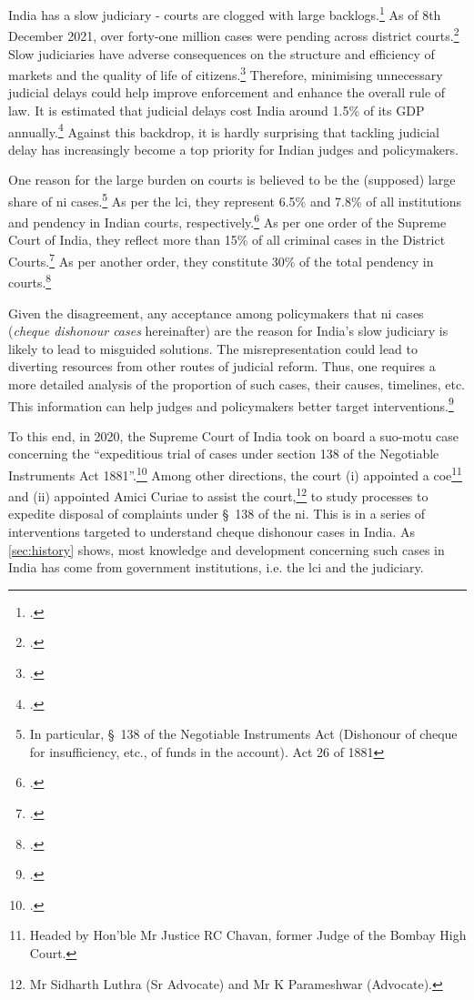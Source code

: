 India has a slow judiciary - courts are clogged with large backlogs.\footcite{moog1992delays, debroy2008justice, dutta2019modernise} As of 8th December 2021, over forty-one million cases were pending across district courts.\footcite{njdg2021} Slow judiciaries have adverse consequences on the structure and efficiency of markets and the quality of life of citizens.\footcite{world2004world, chemin2007impact, rao2020institutional} Therefore, minimising unnecessary judicial delays could help improve enforcement and enhance the overall rule of law. It is estimated that judicial delays cost India around 1.5\% of its GDP annually.\footcite{dey2016_cost} Against this backdrop, it is hardly surprising that tackling judicial delay has increasingly become a top priority for Indian judges and policymakers.

One reason for the large burden on courts is believed to be the (supposed) large share of \gls{ni} cases.\footnote{In particular, \S~138 of the Negotiable Instruments Act (Dishonour of cheque for insufficiency, etc., of funds in the account). Act 26 of 1881} As per the \gls{lci}, they represent 6.5\% and 7.8\% of all institutions and pendency in Indian courts, respectively.\footcite{lci2014_arrears} As per one order of the Supreme Court of India, they reflect more than 15\% of all criminal cases in the District Courts.\footcite{sc2020_makwanavstate} As per another order, they constitute 30\% of the total pendency in courts.\footcite[Similarly, a study published by the Department of Justice briefly touches on the burden of such cases on the judiciary and posits that they constitute 34\% of pending criminal cases in Maharashtra.][]{sc2020_138, mahadik2018_maharashtra}

Given the disagreement, any acceptance among policymakers that \gls{ni} cases (\textit{cheque dishonour cases} hereinafter) are the reason for India's slow judiciary is likely to lead to misguided solutions. The misrepresentation could lead to diverting resources from other routes of judicial reform. Thus, one requires a more detailed analysis of the proportion of such cases, their causes, timelines, etc. This information can help judges and policymakers better target interventions.\footcite[For the importance of accurate judicial data, see][]{damle2020_ecourtsData, daksh2020_data, damle2020_land}

To this end, in 2020, the Supreme Court of India took on board a suo-motu case concerning the “expeditious trial of cases under section 138 of the Negotiable Instruments Act 1881”.\footcite{sc2020_138} Among other directions, the court (i) appointed a \gls{coe}\footnote{Headed by Hon’ble Mr Justice RC Chavan, former Judge of the Bombay High Court.} and (ii) appointed Amici Curiae to assist the court,\footnote{Mr Sidharth Luthra (Sr Advocate) and Mr K Parameshwar (Advocate).} to study processes to expedite disposal of complaints under \S~138 of the \gls{ni}. This is in a series of interventions targeted to understand cheque dishonour cases in India. As \cref{sec:history} shows, most knowledge and development concerning such cases in India has come from government institutions, i.e. the \gls{lci} and the judiciary.

